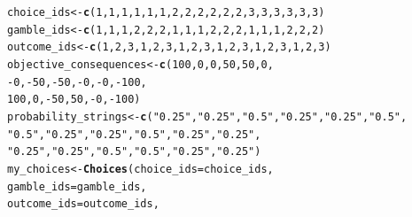\documentclass{article}\usepackage[]{graphicx}\usepackage[]{color}
\makeatletter
\newcommand{\hlnum}[1]{\textcolor[rgb]{0.686,0.059,0.569}{#1}}%
\newcommand{\hlstr}[1]{\textcolor[rgb]{0.192,0.494,0.8}{#1}}%
\newcommand{\hlopt}[1]{\textcolor[rgb]{0,0,0}{#1}}%
\newcommand{\hlstd}[1]{\textcolor[rgb]{0.345,0.345,0.345}{#1}}%
\newcommand{\hlkwb}[1]{\textcolor[rgb]{0.69,0.353,0.396}{#1}}%
\newcommand{\hlkwc}[1]{\textcolor[rgb]{0.333,0.667,0.333}{#1}}%
\newcommand{\hlkwd}[1]{\textcolor[rgb]{0.737,0.353,0.396}{\textbf{#1}}}%
\newenvironment{kframe}{%
 \def\at@end@of@kframe{}%
 \ifinner\ifhmode%
  \def\at@end@of@kframe{\end{minipage}}%
  \begin{minipage}{\columnwidth}%
 \fi\fi%
 \def\FrameCommand##1{\hskip\@totalleftmargin \hskip-\fboxsep
 \colorbox{shadecolor}{##1}\hskip-\fboxsep
     \hskip-\linewidth \hskip-\@totalleftmargin \hskip\columnwidth}%
 \MakeFramed {\advance\hsize-\width
   \@totalleftmargin\z@ \linewidth\hsize
   \@setminipage}}%
 {\par\unskip\endMakeFramed%
 \at@end@of@kframe}
\newenvironment{knitrout}{}{} %
\makeatother
\begin{document}
\begin{knitrout}
\color{fgcolor}\begin{kframe}
\begin{alltt}
\hlstd{choice_ids} \hlkwb{<-} \hlkwd{c}\hlstd{(}\hlnum{1}\hlstd{,} \hlnum{1}\hlstd{,} \hlnum{1}\hlstd{,} \hlnum{1}\hlstd{,} \hlnum{1}\hlstd{,} \hlnum{1}\hlstd{,} \hlnum{2}\hlstd{,} \hlnum{2}\hlstd{,} \hlnum{2}\hlstd{,} \hlnum{2}\hlstd{,} \hlnum{2}\hlstd{,} \hlnum{2}\hlstd{,} \hlnum{3}\hlstd{,} \hlnum{3}\hlstd{,} \hlnum{3}\hlstd{,} \hlnum{3}\hlstd{,} \hlnum{3}\hlstd{,} \hlnum{3}\hlstd{)}
\hlstd{gamble_ids} \hlkwb{<-} \hlkwd{c}\hlstd{(}\hlnum{1}\hlstd{,} \hlnum{1}\hlstd{,} \hlnum{1}\hlstd{,} \hlnum{2}\hlstd{,} \hlnum{2}\hlstd{,} \hlnum{2}\hlstd{,} \hlnum{1}\hlstd{,} \hlnum{1}\hlstd{,} \hlnum{1}\hlstd{,} \hlnum{2}\hlstd{,} \hlnum{2}\hlstd{,} \hlnum{2}\hlstd{,} \hlnum{1}\hlstd{,} \hlnum{1}\hlstd{,} \hlnum{1}\hlstd{,} \hlnum{2}\hlstd{,} \hlnum{2}\hlstd{,} \hlnum{2}\hlstd{)}
\hlstd{outcome_ids} \hlkwb{<-} \hlkwd{c}\hlstd{(}\hlnum{1}\hlstd{,} \hlnum{2}\hlstd{,} \hlnum{3}\hlstd{,} \hlnum{1}\hlstd{,} \hlnum{2}\hlstd{,} \hlnum{3}\hlstd{,} \hlnum{1}\hlstd{,} \hlnum{2}\hlstd{,} \hlnum{3}\hlstd{,} \hlnum{1}\hlstd{,} \hlnum{2}\hlstd{,} \hlnum{3}\hlstd{,} \hlnum{1}\hlstd{,} \hlnum{2}\hlstd{,} \hlnum{3}\hlstd{,} \hlnum{1}\hlstd{,} \hlnum{2}\hlstd{,} \hlnum{3}\hlstd{)}
\hlstd{objective_consequences} \hlkwb{<-} \hlkwd{c}\hlstd{(}\hlnum{100}\hlstd{,} \hlnum{0}\hlstd{,} \hlnum{0}\hlstd{,} \hlnum{50}\hlstd{,} \hlnum{50}\hlstd{,} \hlnum{0}\hlstd{,}
        \hlopt{-}\hlnum{0}\hlstd{,} \hlopt{-}\hlnum{50}\hlstd{,} \hlopt{-}\hlnum{50}\hlstd{,} \hlopt{-}\hlnum{0}\hlstd{,} \hlopt{-}\hlnum{0}\hlstd{,} \hlopt{-}\hlnum{100}\hlstd{,}
        \hlnum{100}\hlstd{,} \hlnum{0}\hlstd{,} \hlopt{-}\hlnum{50}\hlstd{,} \hlnum{50}\hlstd{,} \hlopt{-}\hlnum{0}\hlstd{,} \hlopt{-}\hlnum{100}\hlstd{)}
\hlstd{probability_strings} \hlkwb{<-} \hlkwd{c}\hlstd{(}\hlstr{"0.25"}\hlstd{,} \hlstr{"0.25"}\hlstd{,} \hlstr{"0.5"}\hlstd{,} \hlstr{"0.25"}\hlstd{,} \hlstr{"0.25"}\hlstd{,} \hlstr{"0.5"}\hlstd{,}
        \hlstr{"0.5"}\hlstd{,} \hlstr{"0.25"}\hlstd{,} \hlstr{"0.25"}\hlstd{,} \hlstr{"0.5"}\hlstd{,} \hlstr{"0.25"}\hlstd{,} \hlstr{"0.25"}\hlstd{,}
        \hlstr{"0.25"}\hlstd{,} \hlstr{"0.25"}\hlstd{,} \hlstr{"0.5"}\hlstd{,} \hlstr{"0.5"}\hlstd{,} \hlstr{"0.25"}\hlstd{,} \hlstr{"0.25"}\hlstd{)}
\hlstd{my_choices} \hlkwb{<-} \hlkwd{Choices}\hlstd{(}\hlkwc{choice_ids}\hlstd{=choice_ids,}
        \hlkwc{gamble_ids}\hlstd{=gamble_ids,}
        \hlkwc{outcome_ids}\hlstd{=outcome_ids,}

\end{alltt}
\end{kframe}
\end{knitrout}
\end{document}
